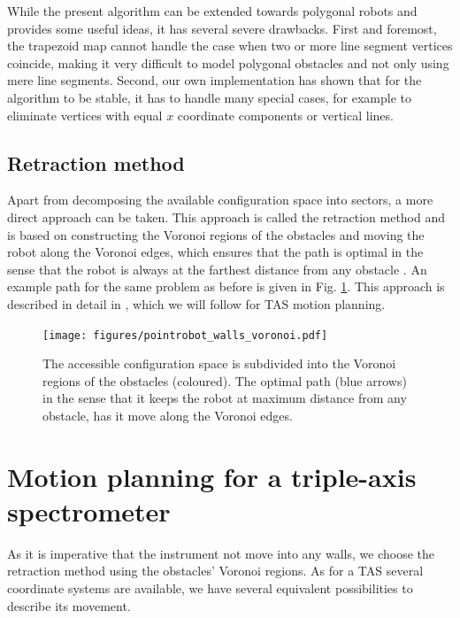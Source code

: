 While the present algorithm can be extended towards polygonal robots \cite[Ch. 13.3, pp. 290-297]{Berg2008} and provides
some useful ideas, it has several severe drawbacks. First and foremost, the trapezoid map cannot handle the case when
two or more line segment vertices coincide, making it very difficult to model polygonal obstacles and not only using mere
line segments. Second, our own implementation has shown that for the algorithm to be stable, it has to handle many 
special cases, for example to eliminate vertices with equal $x$ coordinate components or vertical lines.

\vspace{0.5cm}

\subsection*{Retraction method}
Apart from decomposing the available configuration space into sectors, a more direct approach can be taken. This
approach is called the retraction method and is based on constructing the Voronoi regions 
of the obstacles and moving the robot along the Voronoi edges, which ensures that the path is optimal in the
sense that the robot is always at the farthest distance from any obstacle \cite[pp. 163 and 304]{Berg2008}.
An example path for the same problem as before is given in Fig. \ref{fig:robot_voronoi}.
This approach is described in detail in \cite[pp. 247-251]{FUH_geo2020}, which we will follow for TAS motion planning.

\begin{figure}[htb]
	\centering
	\texttt{[image: figures/pointrobot\_walls\_voronoi.pdf]}
	\caption[Path-finding using Voronoi diagrams.]{
		The accessible configuration space is subdivided into the Voronoi regions of the obstacles (coloured). The optimal
		path (blue arrows) in the sense that it keeps the robot at maximum distance from any obstacle, has it move along the 
		Voronoi edges.}
	\label{fig:robot_voronoi}
\end{figure}



\section{Motion planning for a triple-axis spectrometer}
\label{sec:tasrobot}

As it is imperative that the instrument not move into any walls, we choose the retraction method using the obstacles' Voronoi regions.
As for a TAS several coordinate systems are available, we have several equivalent possibilities to describe its movement. 

